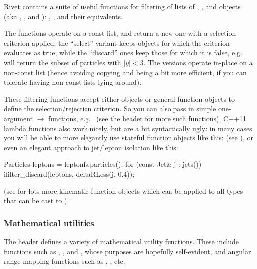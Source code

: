 Rivet contains a suite of useful functions for filtering of lists of
, , and  objects (aka
, , and ): ,
, and their  equivalents.

The  functions operate on a const list, and return a new one
with a selection criterion applied; the ``select'' variant keeps objects for
which the criterion evaluates as true, while the ``discard'' ones keep those for
which it is false, e.g.~ will return the subset of particles with $|y| < 3$.  The
 versions operate in-place on a non-const list (hence avoiding
copying and being a bit more efficient, if you can tolerate having non-const
lists lying around).

These filtering functions accept either  objects or general function
objects to define the selection/rejection criterion. So you can also pass in
simple one-argument  $\to$  functions,
e.g.~ (see the
 header for more such functions). C++11 lambda
functions also work nicely, but are a bit syntactically ugly: in many cases you
will be able to more elegantly use stateful function objects like this:
 (see
), or even an elegant approach to jet/lepton
isolation like this:
%
\begin{snippet}
  Particles leptons = leptonfs.particles();
  for (const Jet& j : jets())
    ifilter_discard(leptons, deltaRLess(j, 0.4));
\end{snippet}
(see  for lots more kinematic function
objects which can be applied to all types that can be cast to
).



\subsubsection{Mathematical utilities}
The  header defines a variety of mathematical
utility functions. These include functions such as ,
,  and , whose purposes are hopefully self-evident, and angular range-mapping
functions such as , , etc.


